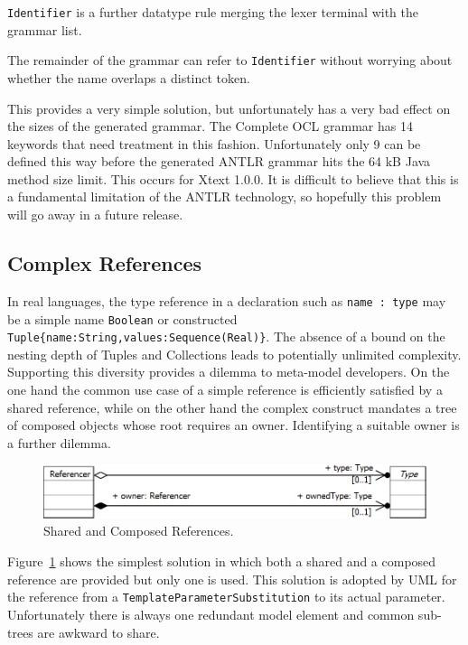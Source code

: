 \documentclass{eceasst}
\begin{document}
\verb+Identifier+ is a further datatype rule merging the lexer terminal with the grammar list.

The remainder of the grammar can refer to \verb+Identifier+ without worrying about whether the name overlaps a distinct token.

This provides a very simple solution, but unfortunately has a very bad effect on the sizes of the generated grammar. The Complete OCL grammar has 14 keywords that need treatment in this fashion. Unfortunately only 9 can be defined this way before the generated ANTLR grammar hits the 64 kB Java method size limit. This occurs for Xtext 1.0.0. It is difficult to believe that this is a fundamental limitation of the ANTLR technology, so hopefully this problem will go away in a future release.

\subsection{Complex References}

In real languages, the type reference in a declaration such as \verb+name : type+ may be a simple name \verb+Boolean+ or constructed \verb+Tuple{name:String,values:Sequence(Real)}+. The absence of a bound on the nesting depth of Tuples and Collections leads to potentially unlimited complexity. Supporting this diversity provides a dilemma to meta-model developers. On the one hand the common use case of a simple reference is efficiently satisfied by a shared reference, while on the other hand the complex construct mandates a tree of composed objects whose root requires an owner. Identifying a suitable owner is a further dilemma.

\begin{figure}
  \begin{center}
    \includegraphics[width=4.75in]{SiblingReference.png}
  \end{center}
  \caption{Shared and Composed References.}
  \label{fig:SiblingReference}
\end{figure}

Figure~\ref{fig:SiblingReference} shows the simplest solution in which both a shared and a composed reference are provided but only one is used. This solution is adopted by UML for the reference from a \verb+TemplateParameterSubstitution+ to its actual parameter. Unfortunately there is always one redundant model element and common sub-trees are awkward to share.
\end{document}
